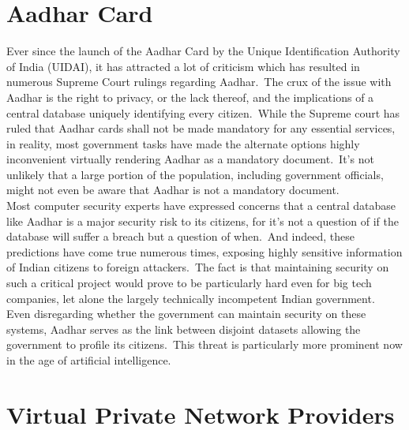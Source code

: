 \documentclass[11pt,a4paper,oneside]{scrarticle}
\begin{document}
    \section{Aadhar Card}\label{sec:aadhar-card}
    Ever since the launch of the Aadhar Card by the Unique Identification Authority of India (UIDAI), it has attracted a
    lot of criticism which has resulted in numerous Supreme Court rulings regarding Aadhar.\ The crux of the issue with
    Aadhar is the right to privacy, or the lack thereof, and the implications of a central database uniquely identifying
    every citizen.\ While the Supreme court has ruled that Aadhar cards shall not be made mandatory for any essential
    services, in reality, most government tasks have made the alternate options highly inconvenient virtually rendering
    Aadhar as a mandatory document.\ It's not unlikely that a large portion of the population, including government
    officials, might not even be aware that Aadhar is not a mandatory document.
    \\
    Most computer security experts have expressed concerns that a central database like Aadhar is a major
    security risk to its citizens, for it's not a question of if the database will suffer a breach but a question of
    when.\ And indeed, these predictions have come true numerous times, exposing highly sensitive information of Indian
    citizens to foreign attackers.\ The fact is that maintaining security on such a critical project would prove to be
    particularly hard even for big tech companies, let alone the largely technically incompetent Indian government.
    \\
    Even disregarding whether the government can maintain security on these systems, Aadhar serves as the link between
    disjoint datasets allowing the government to profile its citizens.\ This threat is particularly more prominent now
    in the age of artificial intelligence.




    \section{Virtual Private Network Providers}\label{sec:virtual-private-network-providers}
\end{document}
